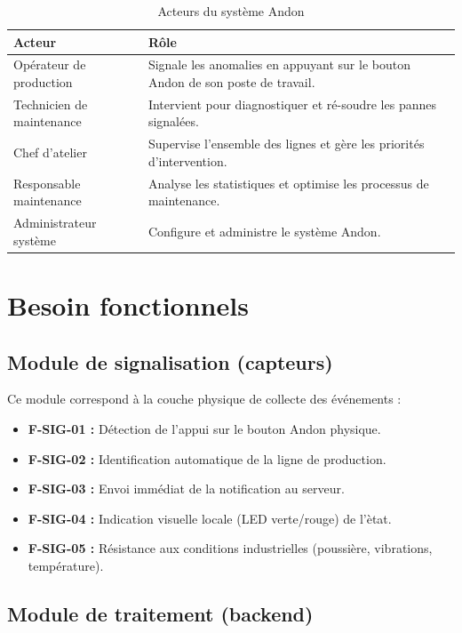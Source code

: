 \begin{table}[htbp]
\centering
\renewcommand{\arraystretch}{1.3}
\begin{tabular}{l p{10cm}}
\toprule
\textbf{Acteur} & \textbf{R\^ole} \\
\midrule
Op\'erateur de production & Signale les anomalies en appuyant sur le bouton Andon de son poste de travail. \\
Technicien de maintenance & Intervient pour diagnostiquer et r\'e-soudre les pannes signal\'ees. \\
Chef d'atelier & Supervise l'ensemble des lignes et g\`ere les priorit\'es d'intervention. \\
Responsable maintenance & Analyse les statistiques et optimise les processus de maintenance. \\
Administrateur syst\`eme & Configure et administre le syst\`eme Andon. \\
\bottomrule
\end{tabular}
\caption{Acteurs du syst\`eme Andon}
\label{tab:acteurs}
\end{table}

\section{Besoin fonctionnels}

\subsection{Module de signalisation (capteurs)}

Ce module correspond \`a la couche physique de collecte des \'ev\'enements :

\begin{itemize}
    \item \textbf{F-SIG-01 :} D\'etection de l'appui sur le bouton Andon physique.
    \item \textbf{F-SIG-02 :} Identification automatique de la ligne de production.
    \item \textbf{F-SIG-03 :} Envoi imm\'ediat de la notification au serveur.
    \item \textbf{F-SIG-04 :} Indication visuelle locale (LED verte/rouge) de l'\`etat.
    \item \textbf{F-SIG-05 :} R\'esistance aux conditions industrielles (poussi\`ere, vibrations, temp\'erature).
\end{itemize}

\subsection{Module de traitement (backend)}

